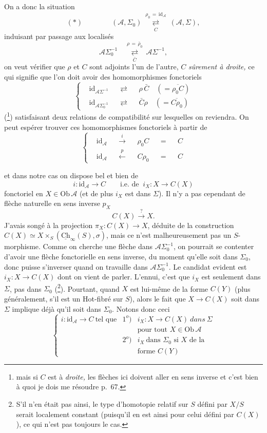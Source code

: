 \documentclass[11pt]{article}
\newcommand{\printedpage}[1]{\marginpar{\footnotesize p.~#1}}
\newcommand{\msp}[1]{\marginpar{\footnotesize [#1]}}
\newcommand{\ul}[1]{\underline{\mathrm{#1}}}
\newcommand{\Ob}{\mathrm{Ob}}
\newcommand{\id}{\mathrm{id}}
\newcommand{\cA}{\mathcal{A}}
\begin{document}
On a donc la situation
\printedpage{40}
\[
(*)\qquad\qquad(\cA,\Sigma_0)\ \underset{C}{\overset{\rho_0\,=\,\id_{\cA}}{\rightleftarrows}}\ (\cA,\Sigma),
\]
induisant par passage aux localisés
\[
\cA\Sigma_0^{-1}\quad\underset{\bar{C}}{\overset{\rho\,=\,\bar{\rho}_0}{\rightleftarrows}}\ \cA\Sigma^{-1},
\]
on veut vérifier que $\rho$ et $C$ sont adjoints l'un de l'autre, $C$ \textit{sûrement à droite,} ce qui signifie que l'on doit avoir des homomorphismes fonctoriels
\[
\left\{
\begin{aligned}
&\id_{\cA\Sigma^{-1}}&&\rightleftarrows&&\rho\,\bar{C}\quad(=\overline{\rho_0C})\\
&\id_{\cA\Sigma_0^{-1}}&&\rightleftarrows&&\bar{C}\rho\quad(=\overline{C\rho_0})
\end{aligned}
\right.
\]
(\footnote[41]{mais si $C$ est à \textit{droite,} les flèches ici doivent aller en sens inverse et c'est bien à quoi je dois me résoudre p.~67.}) satisfaisant deux relations de compatibilité sur lesquelles on reviendra. On peut espérer trouver ces homomorphismes fonctoriels à partir de
\[
\left\{
\begin{aligned}
&\id_{\cA}&&\xrightarrow{\ i\ }&&\rho_0C&&=&&C\\
&\id_{\cA}&&\xleftarrow{\ p\ }&&C\rho_0&&=&&C
\end{aligned}
\right.
\]

\msp{page 66}
et dans notre cas on dispose bel et bien de
\[
i:\id_{\cA}\longrightarrow C\qquad\text{i.e. de }\ i_X:X\longrightarrow C(X)
\]
fonctoriel en $X\in\Ob\,\cA$ (et de plus $i_X$ est dans $\Sigma$). Il n'y a pas cependant de flèche naturelle en sens inverse $p_X$
\[
C(X)\xrightarrow{\ ?\ }X.
\]
J'avais songé à la projection $\pi_X:C(X)\longrightarrow X$, déduite de la construction $C(X)\simeq X\times_S(\ul{Ch}_\infty(S),\sigma)$, mais ce n'est malheureusement pas un $S$-morphisme. Comme on cherche une flèche dans $\cA\Sigma_0^{-1}$, on pourrait se contenter d'avoir une flèche fonctorielle en sens inverse, du moment qu'elle soit dans $\Sigma_0$, donc puisse s'inverser quand on travaille dans $\cA\Sigma_0^{-1}$. Le candidat evident est $i_X:X\longrightarrow C(X)$ dont on vient de parler. L'ennui, c'est que $i_X$ est seulement dans $\Sigma$, pas dans $\Sigma_0$ (\footnote[42]{S'il n'en était pas ainsi, le type d'homotopie relatif sur $S$ défini par $X/S$ serait localement constant (puisqu'il en est ainsi pour celui défini par $C(X)$), ce qui n'est pas toujours le cas.}). Pourtant, quand $X$ est lui-même de la forme $C(Y)$ (plus généralement, s'il est un Hot-fibré sur $S$), alors le fait que $X\longrightarrow C(X)$ soit dans $\Sigma$ implique déjà qu'il soit dans $\Sigma_0$. Notons donc ceci %
\[
\left\{
\begin{array}{lrl}
i:\id_{\cA}\longrightarrow C\ \text{tel que} & 1^o) & i_X:X\longrightarrow C(X)\ \textit{dans}\ \Sigma\\[1ex]
 & & \text{pour tout }X\in\Ob\,\cA\\[1ex]
 & 2^o) & i_X\ \text{dans }\Sigma_0\text{ si }X\text{ de la}\\[1ex]
 & & \text{forme }C(Y)
\end{array}
\right.
\]
\end{document}

